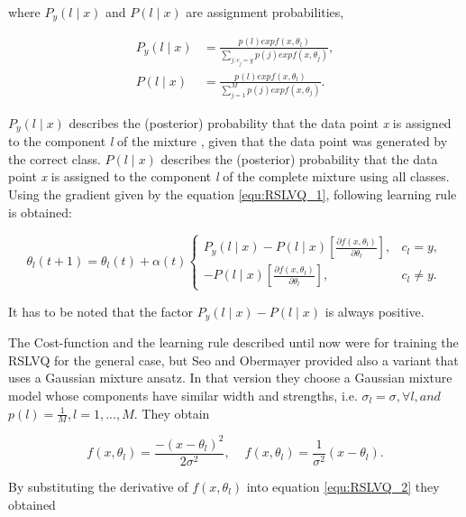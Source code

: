 \documentclass[12pt,oneside,a4paper,parskip]{scrbook}
\begin{document}
where $P_y(l\mid x)$ and $P(l\mid x)$ are assignment probabilities,

\begin{equation}
  \begin{split}
    P_y(l\mid x) &= \frac{p(l) exp f(x, \theta_l)}{\displaystyle\sum_{j:c_j = y}p(j) exp f(x, \theta_j)}, \\
    P(l\mid x) &= \frac{p(l) exp f(x, \theta_l)}{\displaystyle\sum_{j=1}^{M}p(j) exp f(x, \theta_j)}.
  \end{split}
\end{equation}

$P_y(l\mid x)$ describes the (posterior) probability that the data point \textit{x} is assigned to the component \textit{l} of the mixture
, given that the data point was generated by the correct class. $P(l\mid x)$ describes the (posterior) probability that the 
data point \textit{x} is assigned to the component \textit{l} of the complete mixture using all classes.
Using the gradient given by the equation \ref{equ:RSLVQ_1}, following learning rule is obtained: 

\begin{equation}
  \theta_l(t + 1) = \theta_l(t) + \alpha(t) 
  \begin{cases}
    P_y(l\mid x) - P(l\mid x)[\frac{\partial f(x, \theta_l) }{\partial\theta_l}], &c_l = y,  \\
    - P(l\mid x)[\frac{\partial f(x, \theta_l) }{\partial\theta_l}],              &c_l \neq y.              
  \end{cases}
  \label{equ:RSLVQ_2}
\end{equation}

It has to be noted that the factor $P_y(l\mid x) - P(l\mid x)$ is always positive. \cite{RSLVQOrig}

The Cost-function and the learning rule described until now were for training the RSLVQ for the general case, but 
Seo and Obermayer provided also a variant that uses a Gaussian mixture ansatz.
In that version they choose a Gaussian mixture model whose components have similar width and strengths, i.e.
$\sigma_l = \sigma, \forall l, and$ $p(l) = \frac{1}{M}, l = 1, ..., M$. They obtain 

\begin{equation}
  f(x,\theta_l) = \frac{-(x-\theta_l)^2}{2\sigma^2},   \quad   \frac{}{}f(x,\theta_l) = \frac{1}{\sigma^2}(x-\theta_l).
\end{equation}

By substituting the derivative of $f(x,\theta_l)$ into equation \ref{equ:RSLVQ_2} they obtained
\end{document}
